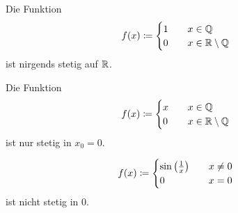 \begin{beispiel}
    Die Funktion
    \begin{align*}
        f(x) &\coloneqq \begin{cases}
                             1\quad &x\in\mathbb{Q}\\
                             0\quad &x\in\mathbb{R}\setminus\mathbb{Q}
        \end{cases}
    \end{align*}
    ist nirgends stetig auf $\mathbb{R}$.
\end{beispiel}
\begin{beispiel}
    Die Funktion
    \begin{align*}
        f(x) &\coloneqq \begin{cases}
                             x\quad &x\in\mathbb{Q}\\
                             0\quad &x\in\mathbb{R}\setminus\mathbb{Q}
        \end{cases}
    \end{align*}
    ist nur stetig in $x_0=0$.
\end{beispiel}
\begin{beispiel}
    \begin{align*}
        f(x) &\coloneqq \begin{cases}
                             \sin\left(\frac{1}{x}\right)\quad &x\neq 0\\
                             0\quad &x = 0
        \end{cases}
    \end{align*}
    ist nicht stetig in 0.
\end{beispiel}

\newpage

